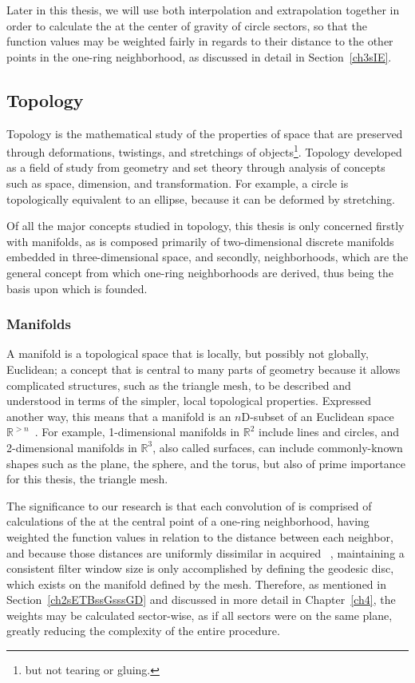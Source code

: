 Later in this thesis, we will use both interpolation and extrapolation together in order to calculate the  at the center of gravity of circle sectors, so that the function values may be weighted fairly in regards to their distance to the other points in the one-ring neighborhood, as discussed in detail in Section~\ref{ch3sIE}.

%
%
%
%
\subsection{Topology}
\label{ch2sETBssT}
Topology is the mathematical study of the properties of space that are preserved through deformations, twistings, and stretchings of objects\footnote{but not tearing or gluing.}. Topology developed as a field of study from geometry and set theory through analysis of concepts such as space, dimension, and transformation. For example, a circle is topologically equivalent to an ellipse, because it can be deformed by stretching.~\cite{Weisstein19c}

Of all the major concepts studied in topology, this thesis is only concerned firstly with manifolds, as \tdd{} is composed primarily of two-dimensional discrete manifolds embedded in three-dimensional space, and secondly, neighborhoods, which are the general concept from which one-ring neighborhoods are derived, thus being the basis upon which  is founded.

%
%
\subsubsection{Manifolds}
\label{ch2sETBssTsssM}
A manifold is a topological space that is locally, but possibly not globally, Euclidean; a concept that is central to many parts of geometry because it allows complicated structures, such as the triangle mesh, to be described and understood in terms of the simpler, local topological properties. Expressed another way, this means that a manifold is an $n$D-subset of an Euclidean space $\mathbb{R}^{>n}$~\cite[p.~199]{Mara12}. For example, 1-dimensional manifolds in $\mathbb{R}^{2}$ include lines and circles, and 2-dimensional manifolds in $\mathbb{R}^{3}$, also called surfaces, can include commonly-known shapes such as the plane, the sphere, and the torus, but also of prime importance for this thesis, the triangle mesh.

The significance to our research is that each convolution of  is comprised of calculations of the  at the central point of a one-ring neighborhood, having weighted the function values in relation to the distance between each neighbor, and because those distances are uniformly dissimilar in acquired \tdd{}~\cite[p.~29]{Mara12}, maintaining a consistent filter window size is only accomplished by defining the geodesic disc, which exists on the manifold defined by the mesh. Therefore, as mentioned in Section~\ref{ch2sETBssGsssGD} and discussed in more detail in Chapter~\ref{ch4}, the weights may be calculated sector-wise, as if all sectors were on the same plane, greatly reducing the complexity of the entire procedure.


